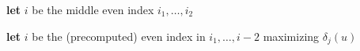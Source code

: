 \documentclass[12pt]{article}
\begin{document}
\begin{Walgo}[ht]{20pt}
  \DontPrintSemicolon
  \Indm
    \Indp
    \BlankLine
    
    \textbf{let} $i$ be the middle even index $i_1,\hdots,i_2$
    
    \textbf{let} $i$ be the (precomputed) even index in $i_1,\hdots,i-2$ maximizing $\delta_j(u)$
    
    \caption{$bdist_k(u,v,i_1,i_2)$}
    \label{alg:bdistk}
\end{Walgo}



 
\end{document}
